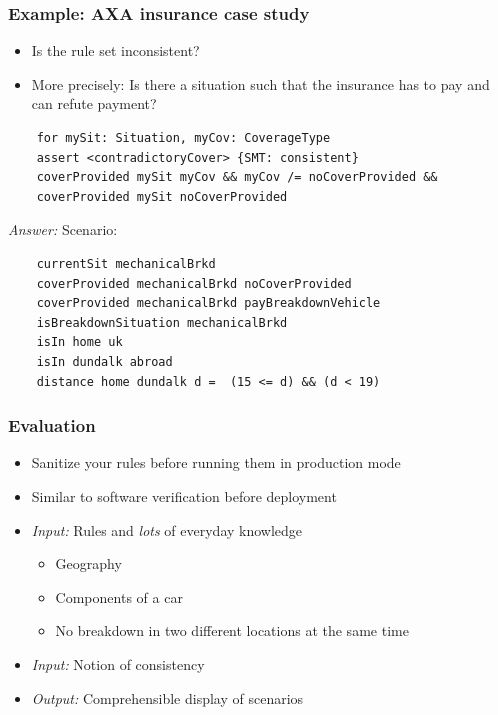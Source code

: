 \documentclass{beamer}
\begin{document}
\begin{frame}[fragile]\frametitle{Example: AXA insurance case study}

  
  \begin{itemize}
  \item Is the rule set inconsistent?
  \item More precisely: Is there a situation such that the insurance has to
    pay and can refute payment?
  \end{itemize}
  
  \begin{lstlisting}
    for mySit: Situation, myCov: CoverageType
    assert <contradictoryCover> {SMT: consistent}
    coverProvided mySit myCov && myCov /= noCoverProvided &&
    coverProvided mySit noCoverProvided
  \end{lstlisting}
\vspace{-5mm}
  \emph{Answer:} Scenario:
  \begin{lstlisting}
    currentSit mechanicalBrkd
    coverProvided mechanicalBrkd noCoverProvided
    coverProvided mechanicalBrkd payBreakdownVehicle
    isBreakdownSituation mechanicalBrkd
    isIn home uk
    isIn dundalk abroad
    distance home dundalk d =  (15 <= d) && (d < 19)
  \end{lstlisting}
  
\end{frame}


\begin{frame}[fragile]\frametitle{Evaluation}

  \begin{itemize}
  \item Sanitize your rules before running them in production mode
  \item Similar to software verification before deployment
  \end{itemize}

  \vspace{4mm}
  \begin{itemize}
  \item \emph{Input:} Rules and \emph{lots} of everyday knowledge
    \begin{itemize}
    \item Geography
    \item Components of a car
    \item No breakdown in two different locations at the same time
    \end{itemize}
  \item \emph{Input:} Notion of consistency
  \item \emph{Output:} Comprehensible display of scenarios
  \end{itemize}

\end{frame}
\end{document}
